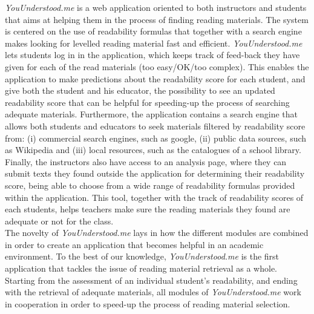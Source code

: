 \documentclass{sig-alternate-05-2015}
\begin{document}


\textit{YouUnderstood.me} is a web application oriented to both instructors and students that aims at helping them in the process of finding reading materials. The system is centered on the use of readability formulas that together with a search engine makes looking for levelled reading material fast and efficient. \textit{YouUnderstood.me} lets students log in in the application, which keeps track of  feed-back they have given for each of the read materials (too easy/OK/too complex). This enables the application to make predictions about the readability score for each student, and give both the student and his educator, the possibility to see an updated readability score that can be helpful for speeding-up the process of searching adequate materials. Furthermore, the application contains a search engine that allows both students and educators to seek materials filtered by readability score from: (i) commercial search engines, such as google, (ii) public data sources, such as Wikipedia and (iii) local resources, such as the catalogues of a school library.\\


Finally, the instructors also have access to an analysis page, where they can submit texts they found outside the application for determining their readability score, being able to choose from a wide range of readability formulas provided within the application. This tool, together with the track of readability scores of each students, helps teachers make sure the reading materials they found are adequate or not for the class.\\

The novelty of \textit{YouUnderstood.me} lays in how the different modules are combined in order to create an application that becomes helpful in an academic environment. To the best of our knowledge, \textit{YouUnderstood.me} is the first application that tackles the issue of reading material retrieval as a whole. Starting from the assessment of an individual student's readability, and ending with the retrieval of adequate materials, all modules of \textit{YouUnderstood.me} work in cooperation in order to speed-up the process of reading material selection.
\end{document}
